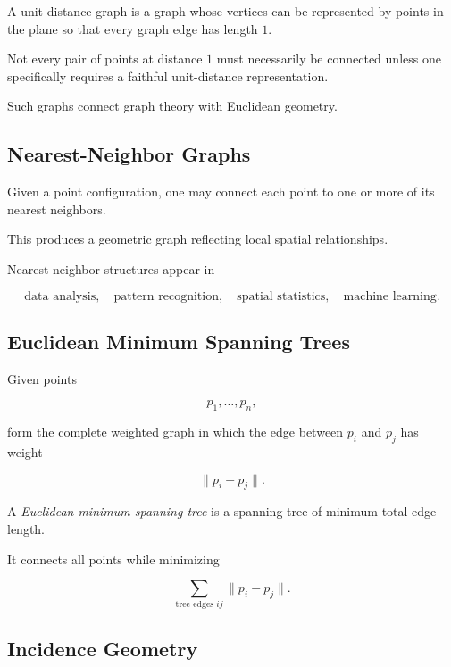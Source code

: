 A unit-distance graph is a graph whose vertices can be represented by points
in the plane so that every graph edge has length \(1\).

Not every pair of points at distance \(1\) must necessarily be connected
unless one specifically requires a faithful unit-distance representation.

Such graphs connect graph theory with Euclidean geometry.

\subsection{Nearest-Neighbor Graphs}
\label{subsec:nearest-neighbor-graphs}

Given a point configuration, one may connect each point to one or more of
its nearest neighbors.

This produces a geometric graph reflecting local spatial relationships.

Nearest-neighbor structures appear in

\[
\boxed{
\text{data analysis},
\quad
\text{pattern recognition},
\quad
\text{spatial statistics},
\quad
\text{machine learning}.
}
\]

\subsection{Euclidean Minimum Spanning Trees}
\label{subsec:euclidean-mst}

Given points

\[
p_1,\ldots,p_n,
\]

form the complete weighted graph in which the edge between \(p_i\) and
\(p_j\) has weight

\[
\|p_i-p_j\|.
\]

A \emph{Euclidean minimum spanning tree} is a spanning tree of minimum total
edge length.

It connects all points while minimizing

\[
\boxed{
\sum_{\text{tree edges }ij}
\|p_i-p_j\|.
}
\]

\subsection{Incidence Geometry}
\label{subsec:discrete-incidence-geometry}

